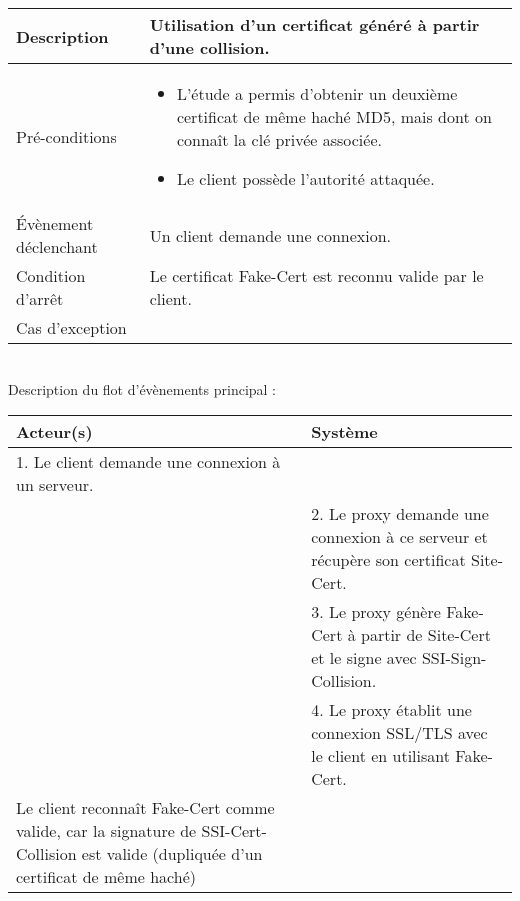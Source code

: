 \begin{tabular}{|>{\columncolor[gray]{.8}}m{4cm}|m{12cm}|}
   \hline
   Description & Utilisation d'un certificat généré à partir d'une collision. \\
   \hline
   Pré-conditions & \begin{itemize}
\item  L'étude a permis d'obtenir un deuxième certificat de même haché MD5, mais dont on connaît la clé privée associée.
  \item Le client possède l'autorité attaquée.
   \end{itemize} \\
   \hline
   Évènement déclenchant & Un client demande une connexion. \\
   \hline
   Condition d'arrêt & Le certificat Fake-Cert est reconnu valide par le client. \\
   \hline
   Cas d'exception  &  \\
   \hline   
\end{tabular}

~\\

Description du flot d'évènements principal :

\begin{tabular}{|m{8cm}|m{8cm}|}
   \hline
  \rowcolor[gray]{.8} Acteur(s) & Système \\
   \hline
   1. Le client demande une connexion à un serveur. & \\
   \hline
&    2. Le proxy demande une connexion à ce serveur et récupère son certificat Site-Cert.  \\
   \hline
   &    3. Le proxy génère Fake-Cert à partir de Site-Cert et le signe avec SSI-Sign-Collision.  \\
   \hline
   &    4. Le proxy établit une connexion SSL/TLS avec le client en utilisant Fake-Cert.  \\
   \hline
 Le client reconnaît Fake-Cert comme valide, car la signature de SSI-Cert-Collision est valide (dupliquée d'un certificat de même haché) & \\
\hline
\end{tabular}